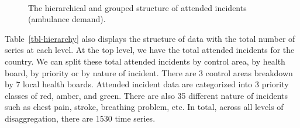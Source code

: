 \documentclass[
  authoryear,
  preprint,
  3p]{elsarticle}
\begin{document}
\begin{figure}

\begin{minipage}[t]{0.56\linewidth}



\end{minipage}%
%
\begin{minipage}[t]{0.02\linewidth}
~\end{minipage}%
%
\begin{minipage}[t]{0.42\linewidth}



\end{minipage}%

\caption{\label{fig-hierarchy}The hierarchical and grouped structure of
attended incidents (ambulance demand).}

\end{figure}%

Table~\ref{tbl-hierarchy} also displays the structure of data with the
total number of series at each level. At the top level, we have the
total attended incidents for the country. We can split these total
attended incidents by control area, by health board, by priority or by
nature of incident. There are 3 control areas breakdown by 7 local
health boards. Attended incident data are categorized into 3 priority
classes of red, amber, and green. There are also 35 different nature of
incidents such as chest pain, stroke, breathing problem, etc. In total,
across all levels of disaggregation, there are 1530 time series.
\end{document}
